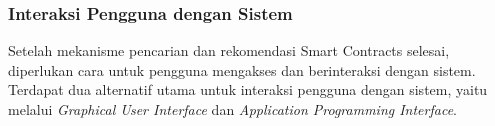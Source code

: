 \subsubsection{Interaksi Pengguna dengan Sistem}

Setelah mekanisme pencarian dan rekomendasi Smart Contracts selesai, diperlukan cara untuk pengguna mengakses dan berinteraksi dengan sistem. Terdapat dua alternatif utama untuk interaksi pengguna dengan sistem, yaitu melalui \textit{Graphical User Interface} dan \textit{Application Programming Interface}.